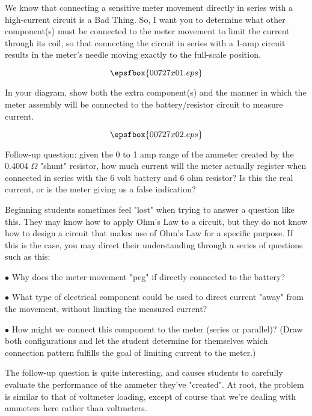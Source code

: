 

We know that connecting a sensitive meter movement directly in series with a high-current circuit is a Bad Thing.  So, I want you to determine what other component(s) must be connected to the meter movement to limit the current through its coil, so that connecting the circuit in series with a 1-amp circuit results in the meter's needle moving exactly to the full-scale position.

$$\epsfbox{00727x01.eps}$$

In your diagram, show both the extra component(s) and the manner in which the meter assembly will be connected to the battery/resistor circuit to measure current.







$$\epsfbox{00727x02.eps}$$

\vskip 10pt

Follow-up question: given the 0 to 1 amp range of the ammeter created by the 0.4004 $\Omega$ "shunt" resistor, how much current will the meter actually register when connected in series with the 6 volt battery and 6 ohm resistor?  Is this the real current, or is the meter giving us a false indication?







Beginning students sometimes feel "lost" when trying to answer a question like this.  They may know how to apply Ohm's Law to a circuit, but they do not know how to design a circuit that makes use of Ohm's Law for a specific purpose.  If this is the case, you may direct their understanding through a series of questions such as this:

\medskip
\item{$\bullet$} Why does the meter movement "peg" if directly connected to the battery?
\item{$\bullet$} What type of electrical component could be used to direct current "away" from the movement, without limiting the measured current?
\item{$\bullet$} How might we connect this component to the meter (series or parallel)?  (Draw both configurations and let the student determine for themselves which connection pattern fulfills the goal of limiting current to the meter.)
\medskip

The follow-up question is quite interesting, and causes students to carefully evaluate the performance of the ammeter they've "created".  At root, the problem is similar to that of voltmeter loading, except of course that we're dealing with ammeters here rather than voltmeters.




